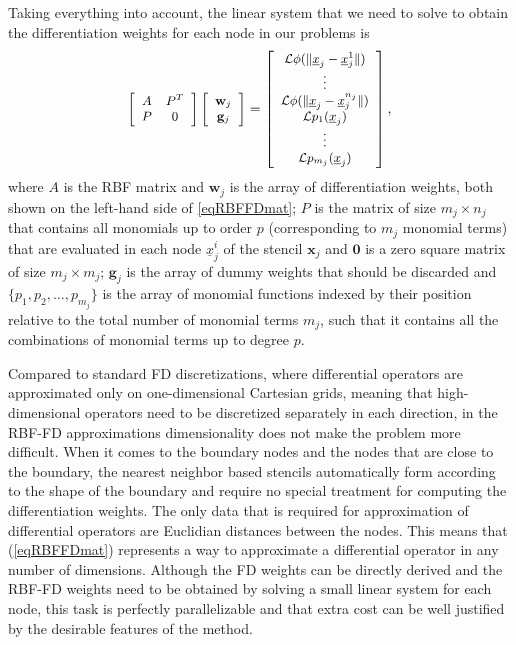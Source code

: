 \documentclass{UUThesisTemplate}
\begin{document}
\par
Taking everything into account, the linear system that we need to solve to obtain the differentiation weights for each node in our problems is
\begin{equation}
{\footnotesize{
\label{eq:D2}
\left[\begin{array}{cc}
A & P^T \\
P & 0 \\
\end{array}\right]
\left[\begin{array}{c}
{\mathbf{w}}_j\\
{\mathbf{g}}_j\\
\end{array}\right]=
\left[\begin{array}{c}
\mathcal{L}\phi(\|\underline{x}_{j}-\underline{x}_j^{1}\|)\\
\vdots \\
\mathcal{L}\phi(\|\underline{x}_{j}-\underline{x}_j^{n_j}\|)\\
\mathcal{L}p_1(\underline{x}_j)\\
\vdots\\
\mathcal{L}p_{m_j}(\underline{x}_j)
\end{array}\right],
}}
\end{equation}
where $A$ is the RBF matrix and $\mathbf{w}_j$ is the array of differentiation weights, both shown on the left-hand side of \eqref{eqRBFFDmat}; $P$ is the matrix of size $m_j \times n_j$ that contains all monomials up to order $p$ (corresponding to $m_j$ monomial terms) that are evaluated in each node $\underline{x}_j^i$ of the stencil $\mathbf{x}_j$ and $\mathbf{0}$ is a zero square matrix of size $m_j \times m_j$; $\mathbf{g}_j$ is the array of dummy weights that should be discarded and $\{p_1, p_2, \ldots, p_{m_j}\}$ is the array of monomial functions indexed by their position relative to the total number of monomial terms $m_j$, such that it contains all the combinations of monomial terms up to degree $p$.
\par
Compared to standard FD discretizations, where differential operators are approximated only on one-dimensional Cartesian grids, meaning that high-dimensional operators need to be discretized separately in each direction, in the RBF-FD approximations dimensionality does not make the problem more difficult. When it comes to the boundary nodes and the nodes that are close to the boundary, the nearest neighbor based stencils automatically form according to the shape of the boundary and require no special treatment for computing the differentiation weights. The only data that is required for approximation of differential operators are Euclidian distances between the nodes. This means that (\ref{eqRBFFDmat}) represents a way to approximate a differential operator in any number of dimensions. Although the FD weights can be directly derived and the RBF-FD weights need to be obtained by solving a small linear system for each node, this task is perfectly parallelizable and that extra cost can be well justified by the desirable features of the method.
\end{document}
